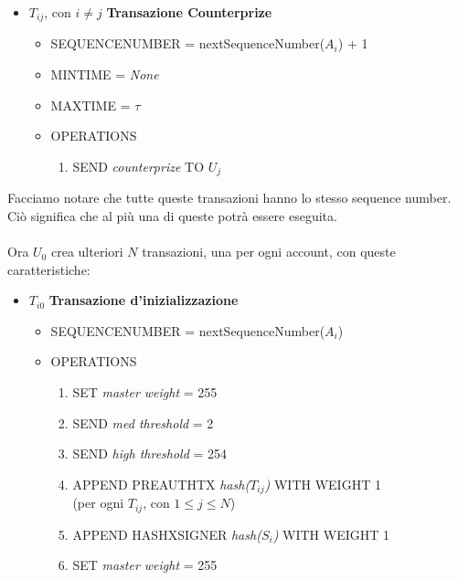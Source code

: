 \begin{itemize}
	\item $T_{ij} $, con $ i \neq j $ \textbf{Transazione Counterprize}
	      \begin{itemize}
		      \item SEQUENCE\textunderscore NUMBER = nextSequenceNumber($ A_i $) + 1
		      \item MIN\textunderscore TIME = \textit{None}
		      \item MAX\textunderscore TIME = $ \tau $
		      \item OPERATIONS
		            \begin{enumerate}
			            \item SEND \textit{counterprize} TO $ U_j $
		            \end{enumerate}
	      \end{itemize}
\end{itemize}

Facciamo notare che tutte queste transazioni hanno lo stesso sequence number.
Ciò significa che al più una di queste potrà essere eseguita.
\\
\\
Ora $ U_0 $ crea ulteriori $ N $ transazioni, una per ogni account,
con queste caratteristiche:
\begin{itemize}
	\item $T_{i0} $ \textbf{Transazione d'inizializzazione}
	      \begin{itemize}
		      \item SEQUENCE\textunderscore NUMBER = nextSequenceNumber($ A_i $)
		      \item OPERATIONS
		            \begin{enumerate}
			            \item SET \textit{master weight} = 255
			            \item SEND \textit{med threshold} = 2
			            \item SEND \textit{high threshold} = 254
			            \item APPEND PRE\textunderscore AUTH\textunderscore TX
			                  \textit{hash($ T_{ij} $)} WITH WEIGHT 1
			                  \\(per ogni $ T_{ij} $, con $ 1 \leq j \leq N $)
			            \item APPEND HASHX\textunderscore SIGNER
			                  \textit{hash($ S_{i} $)} WITH WEIGHT 1
			            \item SET \textit{master weight} = 255

		            \end{enumerate}
	      \end{itemize}
\end{itemize}

